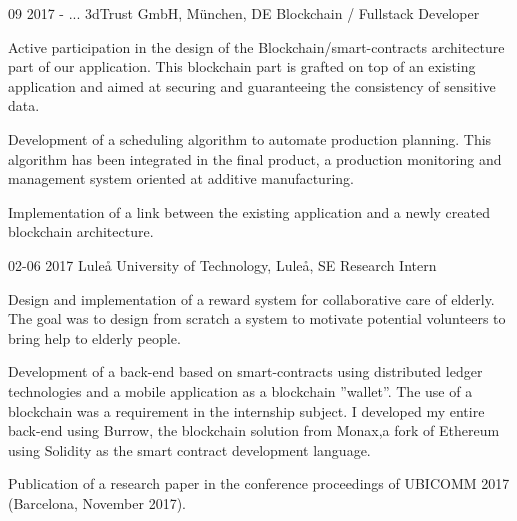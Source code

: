 \documentclass[a4paper]{friggeri-cv}
\begin{document}
\begin{entrylist}
\entry
{09 2017 - ...}
{3dTrust GmbH, München, DE}
{Blockchain / Fullstack Developer}
{\begin{myitemize}
\vspace{-12pt}
\item Active participation in the design of the Blockchain/smart-contracts architecture part of our application. This blockchain part is grafted on top of an existing application and aimed at securing and guaranteeing the consistency of sensitive data.
\item Development of a scheduling algorithm to automate production planning. This algorithm has been integrated in the final product, a production monitoring and management system oriented at additive manufacturing.  
\item Implementation of a link between the existing application and a newly created blockchain architecture.
\end{myitemize}
}

\entry
{02-06 2017}
{Luleå University of Technology, Luleå, SE}
{Research Intern}
{\begin{myitemize}
\vspace{-12pt}
\item Design and implementation of a reward system for collaborative care of elderly. The goal was to design from scratch a system to motivate potential volunteers to bring help to elderly people.
\item Development of a back-end based on smart-contracts using distributed ledger technologies and a mobile application as a blockchain ”wallet”. The use of a blockchain was a requirement in the internship subject. I developed my entire back-end using Burrow, the blockchain solution from Monax,a fork of Ethereum using Solidity as the smart contract development language.
\item Publication of a research paper in the conference proceedings of UBICOMM 2017 (Barcelona, November 2017).
\end{myitemize}
}


\end{entrylist}
\end{document}
